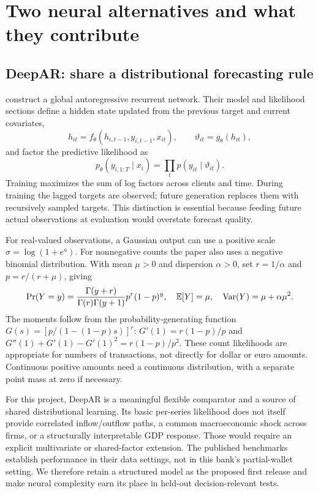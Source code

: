 \section{Two neural alternatives and what they contribute}
\subsection{DeepAR: share a distributional forecasting rule}
\citet{salinas2020deepar} construct a global autoregressive recurrent network. Their model and likelihood sections define a hidden state updated from the previous target and current covariates,
\begin{equation}
h_{it}=f_\theta(h_{i,t-1},y_{i,t-1},x_{it}),\qquad
\vartheta_{it}=g_\theta(h_{it}),
\end{equation}
and factor the predictive likelihood as
\begin{equation}
p_\theta(y_{i,1:T}\mid x_i)=\prod_t p(y_{it}\mid\vartheta_{it}).
\label{eq:deepar}
\end{equation}
Training maximizes the sum of log factors across clients and time. During training the lagged targets are observed; future generation replaces them with recursively sampled targets. This distinction is essential because feeding future actual observations at evaluation would overstate forecast quality.

For real-valued observations, a Gaussian output can use a positive scale $\sigma=\log(1+e^a)$. For nonnegative counts the paper also uses a negative binomial distribution. With mean $\mu>0$ and dispersion $\alpha>0$, set $r=1/\alpha$ and $p=r/(r+\mu)$, giving
\begin{equation}
\Pr(Y=y)=\frac{\Gamma(y+r)}{\Gamma(r)\Gamma(y+1)}
p^r(1-p)^y,\quad
\mathbb E[Y]=\mu,\quad\operatorname{Var}(Y)=\mu+\alpha\mu^2.
\end{equation}
The moments follow from the probability-generating function
$G(s)=[p/(1-(1-p)s)]^r$: $G'(1)=r(1-p)/p$ and
$G''(1)+G'(1)-G'(1)^2=r(1-p)/p^2$.
These count likelihoods are appropriate for numbers of transactions, not directly for dollar or euro amounts. Continuous positive amounts need a continuous distribution, with a separate point mass at zero if necessary.

For this project, DeepAR is a meaningful flexible comparator and a source of shared distributional learning. Its basic per-series likelihood does not itself provide correlated inflow/outflow paths, a common macroeconomic shock across firms, or a structurally interpretable GDP response. Those would require an explicit multivariate or shared-factor extension. The published benchmarks establish performance in their data settings, not in this bank's partial-wallet setting. We therefore retain a structured model as the proposed first release and make neural complexity earn its place in held-out decision-relevant tests.

